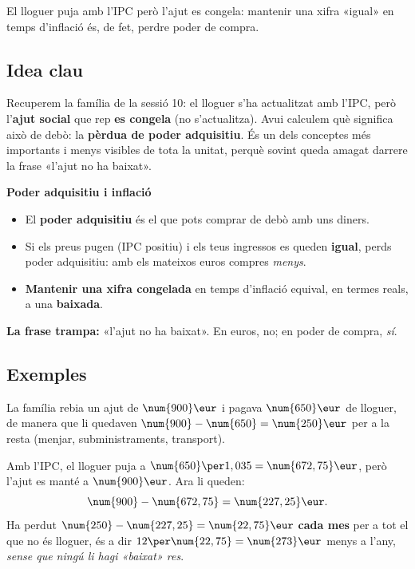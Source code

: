 %
{El lloguer puja amb l'IPC però l'ajut es congela: mantenir una xifra «igual» en temps d'inflació és, de fet, perdre poder de compra.}

\subsection{Idea clau}

Recuperem la família de la sessió 10: el lloguer s'ha actualitzat amb l'IPC, però
l'\textbf{ajut social} que rep \textbf{es congela} (no s'actualitza). Avui calculem
què significa això de debò: la \textbf{pèrdua de poder adquisitiu}. És un dels conceptes
més importants i menys visibles de tota la unitat, perquè sovint queda amagat darrere
la frase «l'ajut no ha baixat».

\begin{idea}
\textbf{Poder adquisitiu i inflació}
\begin{itemize}[leftmargin=1.4em, itemsep=2pt]
  \item El \textbf{poder adquisitiu} és el que pots comprar de debò amb uns diners.
  \item Si els preus pugen (IPC positiu) i els teus ingressos es queden \textbf{igual},
        perds poder adquisitiu: amb els mateixos euros compres \emph{menys}.
  \item \textbf{Mantenir una xifra congelada} en temps d'inflació equival, en termes
        reals, a una \textbf{baixada}.
\end{itemize}
\textbf{La frase trampa:} «l'ajut no ha baixat». En euros, no; en poder de compra,
\emph{sí}.
\end{idea}

\subsection{Exemples}

\begin{exemple}
La família rebia un ajut de $\num{900}\eur$ i pagava $\num{650}\eur$ de lloguer, de
manera que li quedaven $\num{900}-\num{650}=\num{250}\eur$ per a la resta (menjar,
subministraments, transport).

Amb l'IPC, el lloguer puja a $\num{650}\per 1,035=\num{672,75}\eur$, però l'ajut es
manté a $\num{900}\eur$. Ara li queden:
\[
\num{900}-\num{672,75}=\num{227,25}\eur.
\]
Ha perdut $\num{250}-\num{227,25}=\num{22,75}\eur$ \textbf{cada mes} per a tot el que
no és lloguer, és a dir $12\per\num{22,75}=\num{273}\eur$ menys a l'any, \emph{sense
que ningú li hagi «baixat» res}.
\end{exemple}

